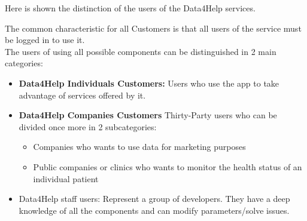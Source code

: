 Here is shown the distinction of the users of the Data4Help services.

\noindent The common characteristic for all Customers is that all users of the service must be logged in to use it.
\\
\noindent The users of using all possible components can be distinguished in 2 main categories:
\\
\begin{itemize}
    \item \textbf{Data4Help Individuals Customers:}
Users who use the app to take advantage of services offered by it.
    \item \textbf{Data4Help Companies Customers}
Thirty-Party users who can be divided once more in 2 subcategories:
    \begin{itemize}
        \item Companies who wants to use data for marketing purposes
        \item Public companies or clinics who wants to monitor the health status of an individual patient
    \end{itemize}
    \item Data4Help staff users:
Represent a group of developers. They have a deep knowledge of all the components and can modify parameters/solve issues.

\end{itemize}





